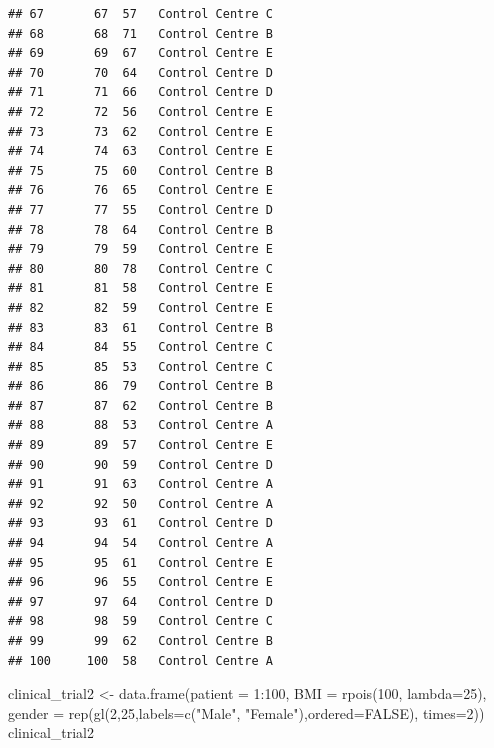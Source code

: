 \documentclass[]{article}
\newenvironment{Shaded}{\begin{snugshade}}{\end{snugshade}}
\newcommand{\AttributeTok}[1]{\textcolor[rgb]{0.77,0.63,0.00}{#1}}
\newcommand{\ConstantTok}[1]{\textcolor[rgb]{0.00,0.00,0.00}{#1}}
\newcommand{\DecValTok}[1]{\textcolor[rgb]{0.00,0.00,0.81}{#1}}
\newcommand{\FunctionTok}[1]{\textcolor[rgb]{0.00,0.00,0.00}{#1}}
\newcommand{\NormalTok}[1]{#1}
\newcommand{\OtherTok}[1]{\textcolor[rgb]{0.56,0.35,0.01}{#1}}
\newcommand{\SpecialCharTok}[1]{\textcolor[rgb]{0.00,0.00,0.00}{#1}}
\newcommand{\StringTok}[1]{\textcolor[rgb]{0.31,0.60,0.02}{#1}}
\begin{document}
\begin{verbatim}
## 67       67  57   Control Centre C
## 68       68  71   Control Centre B
## 69       69  67   Control Centre E
## 70       70  64   Control Centre D
## 71       71  66   Control Centre D
## 72       72  56   Control Centre E
## 73       73  62   Control Centre E
## 74       74  63   Control Centre E
## 75       75  60   Control Centre B
## 76       76  65   Control Centre E
## 77       77  55   Control Centre D
## 78       78  64   Control Centre B
## 79       79  59   Control Centre E
## 80       80  78   Control Centre C
## 81       81  58   Control Centre E
## 82       82  59   Control Centre E
## 83       83  61   Control Centre B
## 84       84  55   Control Centre C
## 85       85  53   Control Centre C
## 86       86  79   Control Centre B
## 87       87  62   Control Centre B
## 88       88  53   Control Centre A
## 89       89  57   Control Centre E
## 90       90  59   Control Centre D
## 91       91  63   Control Centre A
## 92       92  50   Control Centre A
## 93       93  61   Control Centre D
## 94       94  54   Control Centre A
## 95       95  61   Control Centre E
## 96       96  55   Control Centre E
## 97       97  64   Control Centre D
## 98       98  59   Control Centre C
## 99       99  62   Control Centre B
## 100     100  58   Control Centre A
\end{verbatim}

\begin{Shaded}
\begin{Highlighting}[]
\NormalTok{clinical\_trial2 }\OtherTok{\textless{}{-}} \FunctionTok{data.frame}\NormalTok{(}\AttributeTok{patient =} \DecValTok{1}\SpecialCharTok{:}\DecValTok{100}\NormalTok{,}
                              \AttributeTok{BMI =} \FunctionTok{rpois}\NormalTok{(}\DecValTok{100}\NormalTok{, }\AttributeTok{lambda=}\DecValTok{25}\NormalTok{),}
                              \AttributeTok{gender =} \FunctionTok{rep}\NormalTok{(}\FunctionTok{gl}\NormalTok{(}\DecValTok{2}\NormalTok{,}\DecValTok{25}\NormalTok{,}\AttributeTok{labels=}\FunctionTok{c}\NormalTok{(}\StringTok{"Male"}\NormalTok{, }\StringTok{"Female"}\NormalTok{),}\AttributeTok{ordered=}\ConstantTok{FALSE}\NormalTok{),}
                                           \AttributeTok{times=}\DecValTok{2}\NormalTok{))}
\NormalTok{clinical\_trial2}
\end{Highlighting}
\end{Shaded}
\end{document}
